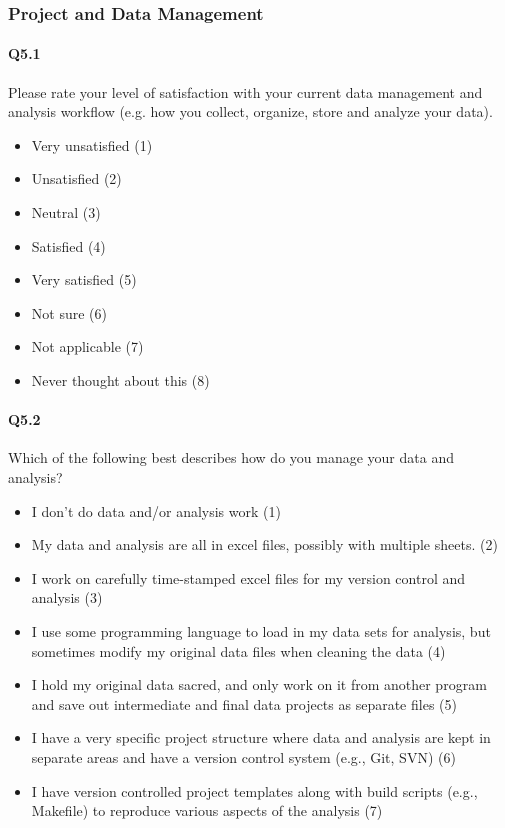 \documentclass[020-persona\_validation.tex]{subfiles}
\begin{document}
    \subsubsection{Project and Data Management}

        \paragraph{Q5.1}

            Please rate your level of satisfaction with your current data management and analysis workflow
            (e.g. how you collect, organize, store and analyze your data).

            \begin{itemize}
                \item Very unsatisfied  (1)
                \item Unsatisfied  (2)
                \item Neutral  (3)
                \item Satisfied  (4)
                \item Very satisfied  (5)
                \item Not sure  (6)
                \item Not applicable  (7)
                \item Never thought about this  (8)
            \end{itemize}

        \paragraph{Q5.2}

            Which of the following best describes how do you manage your data and analysis?

            \begin{itemize}
                \item I don't do data and/or analysis work  (1)
                \item My data and analysis are all in excel files, possibly with multiple sheets.  (2)
                \item I work on carefully time-stamped excel files for my version control and analysis  (3)
                \item I use some programming language to load in my data sets for analysis, but sometimes modify my original data files when cleaning the data  (4)
                \item I hold my original data sacred, and only work on it from another program and save out intermediate and final data projects as separate files  (5)
                \item I have a very specific project structure where data and analysis are kept in separate areas and have a version control system (e.g., Git, SVN)  (6)
                \item I have version controlled project templates along with build scripts (e.g., Makefile) to reproduce various aspects of the analysis  (7)
            \end{itemize}
\end{document}
